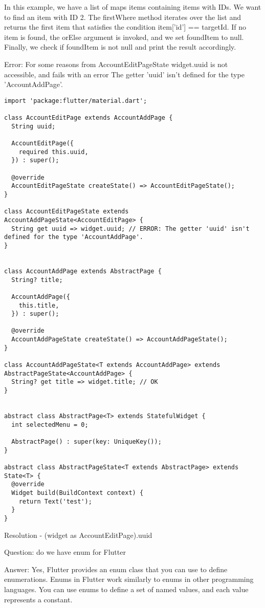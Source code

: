 In this example, we have a list of maps items containing items with IDs. We want to find an item with ID 2. 
The firstWhere method iterates over the list and returns the first item that satisfies the condition 
item['id'] == targetId. If no item is found, the orElse argument is invoked, and we set foundItem to null. 
Finally, we check if foundItem is not null and print the result accordingly.

Error: For some reasons from AccountEditPageState widget.uuid is not accessible, and fails with an error The getter 
'uuid' isn't defined for the type 'AccountAddPage'.

\begin{lstlisting}
import 'package:flutter/material.dart';

class AccountEditPage extends AccountAddPage {
  String uuid;

  AccountEditPage({
    required this.uuid,
  }) : super();

  @override
  AccountEditPageState createState() => AccountEditPageState();
}

class AccountEditPageState extends AccountAddPageState<AccountEditPage> {
  String get uuid => widget.uuid; // ERROR: The getter 'uuid' isn't defined for the type 'AccountAddPage'.
}


class AccountAddPage extends AbstractPage {
  String? title;

  AccountAddPage({
    this.title,
  }) : super();

  @override
  AccountAddPageState createState() => AccountAddPageState();
}

class AccountAddPageState<T extends AccountAddPage> extends AbstractPageState<AccountAddPage> {
  String? get title => widget.title; // OK
}


abstract class AbstractPage<T> extends StatefulWidget {
  int selectedMenu = 0;

  AbstractPage() : super(key: UniqueKey());
}

abstract class AbstractPageState<T extends AbstractPage> extends State<T> {
  @override
  Widget build(BuildContext context) {
    return Text('test');
  }
}
\end{lstlisting}

Resolution - (widget as AccountEditPage).uuid


Question: do we have enum for Flutter

Answer: Yes, Flutter provides an enum class that you can use to define enumerations. Enums in Flutter work similarly to 
enums in other programming languages. You can use enums to define a set of named values, and each value represents 
a constant.

